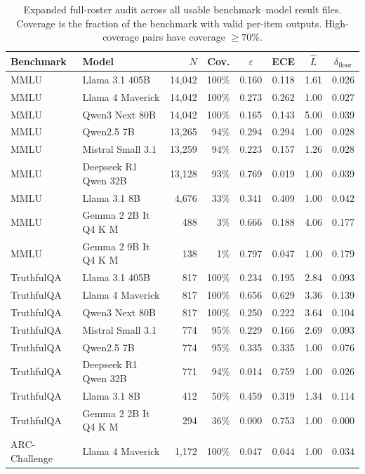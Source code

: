 \begin{table}[t]
\centering
\caption{Expanded full-roster audit across all usable benchmark--model result files. Coverage is the fraction of the benchmark with valid per-item outputs. High-coverage pairs have coverage $\geq 70\%$.}
\label{tab:full-roster}
\small
\begin{tabular}{llrrcccc}
\toprule
Benchmark & Model & $N$ & Cov. & $\varepsilon$ & ECE & $\hat{L}$ & $\delta_{\mathrm{floor}}$ \\
\midrule
MMLU & Llama 3.1 405B & 14,042 & 100\% & 0.160 & 0.118 & 1.61 & 0.026 \\
MMLU & Llama 4 Maverick & 14,042 & 100\% & 0.273 & 0.262 & 1.00 & 0.027 \\
MMLU & Qwen3 Next 80B & 14,042 & 100\% & 0.165 & 0.143 & 5.00 & 0.039 \\
MMLU & Qwen2.5 7B & 13,265 & 94\% & 0.294 & 0.294 & 1.00 & 0.028 \\
MMLU & Mistral Small 3.1 & 13,259 & 94\% & 0.223 & 0.157 & 1.26 & 0.028 \\
MMLU & Deepseek R1 Qwen 32B & 13,128 & 93\% & 0.769 & 0.019 & 1.00 & 0.039 \\
MMLU & Llama 3.1 8B & 4,676 & 33\% & 0.341 & 0.409 & 1.00 & 0.042 \\
MMLU & Gemma 2 2B It Q4 K M & 488 & 3\% & 0.666 & 0.188 & 4.06 & 0.177 \\
MMLU & Gemma 2 9B It Q4 K M & 138 & 1\% & 0.797 & 0.047 & 1.00 & 0.179 \\
\midrule
TruthfulQA & Llama 3.1 405B & 817 & 100\% & 0.234 & 0.195 & 2.84 & 0.093 \\
TruthfulQA & Llama 4 Maverick & 817 & 100\% & 0.656 & 0.629 & 3.36 & 0.139 \\
TruthfulQA & Qwen3 Next 80B & 817 & 100\% & 0.250 & 0.222 & 3.64 & 0.104 \\
TruthfulQA & Mistral Small 3.1 & 774 & 95\% & 0.229 & 0.166 & 2.69 & 0.093 \\
TruthfulQA & Qwen2.5 7B & 774 & 95\% & 0.335 & 0.335 & 1.00 & 0.076 \\
TruthfulQA & Deepseek R1 Qwen 32B & 771 & 94\% & 0.014 & 0.759 & 1.00 & 0.026 \\
TruthfulQA & Llama 3.1 8B & 412 & 50\% & 0.459 & 0.319 & 1.34 & 0.114 \\
TruthfulQA & Gemma 2 2B It Q4 K M & 294 & 36\% & 0.000 & 0.753 & 1.00 & 0.000 \\
\midrule
ARC-Challenge & Llama 4 Maverick & 1,172 & 100\% & 0.047 & 0.044 & 1.00 & 0.034 \\

\end{tabular}
\end{table}
